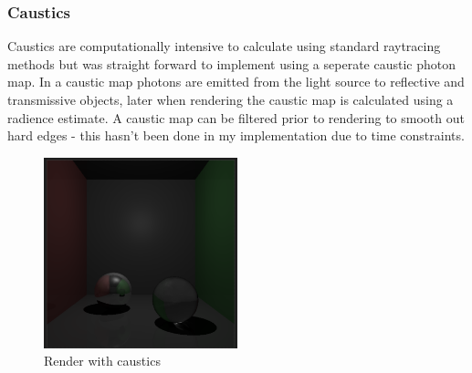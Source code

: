 \documentclass{article}
\begin{document}
\subsubsection{Caustics}
Caustics are computationally intensive to calculate using standard raytracing methods but was straight forward to implement using a seperate caustic photon map. In a caustic map photons are emitted from the light source to reflective and transmissive objects, later when rendering the caustic map is calculated using a radience estimate. A caustic map can be filtered prior to rendering to smooth out hard edges - this hasn't been done in my implementation due to time constraints.
\begin{figure}[h]
\centering
\includegraphics[width=0.5\textwidth]{caustics}
\caption{Render with caustics}
\label{fig:caustics}
\end{figure}
\end{document}
